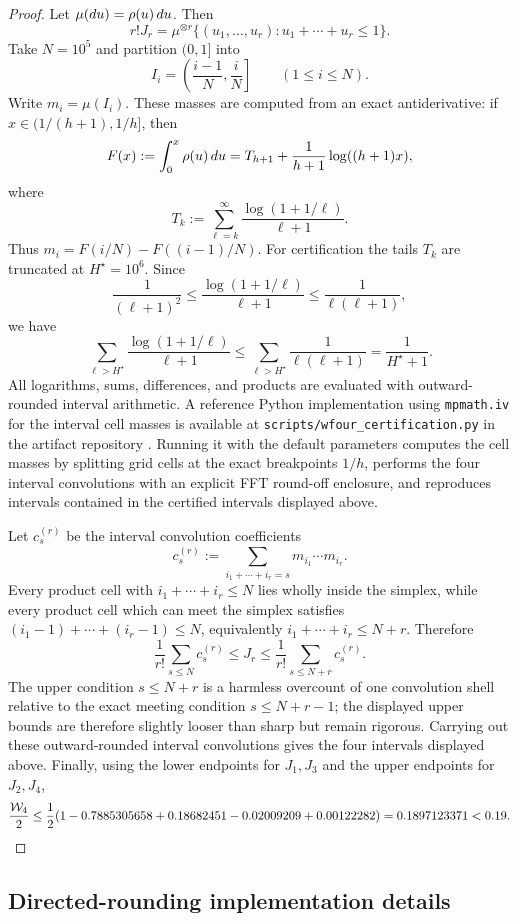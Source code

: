\begin{proof}
Let $\mu(du)=\rho(u)\,du$.  Then
\[
  r!J_r
  =
  \mu^{\otimes r}\{(u_1,\ldots,u_r):u_1+\cdots+u_r\le1\}.
\]
Take $N=10^5$ and partition $(0,1]$ into
\[
  I_i=\left(\frac{i-1}{N},\frac{i}{N}\right]\qquad(1\le i\le N).
\]
Write $m_i=\mu(I_i)$.  These masses are computed from an exact antiderivative:
if $x\in(1/(h+1),1/h]$, then
\[
  F(x):=\int_0^x\rho(u)\,du
  =
  T_{h+1}+\frac{1}{h+1}\log((h+1)x),
\]
where
\[
  T_k:=\sum_{\ell=k}^{\infty}\frac{\log(1+1/\ell)}{\ell+1}.
\]
Thus $m_i=F(i/N)-F((i-1)/N)$.  For certification the tails $T_k$ are truncated
at $H^\star=10^6$.  Since
\[
  \frac{1}{(\ell+1)^2}
  \le
  \frac{\log(1+1/\ell)}{\ell+1}
  \le
  \frac{1}{\ell(\ell+1)},
\]
we have
\[
  \sum_{\ell>H^\star}\frac{\log(1+1/\ell)}{\ell+1}
  \le
  \sum_{\ell>H^\star}\frac{1}{\ell(\ell+1)}
  =
  \frac{1}{H^\star+1}.
\]
All logarithms, sums, differences, and products are evaluated with
outward-rounded interval arithmetic.  A reference Python implementation using
\texttt{mpmath.iv} for the interval cell masses is available at
\texttt{scripts/wfour\_certification.py} in the artifact repository
\cite{ErdosHarness26}.  Running it with the default parameters computes the cell
masses by splitting grid cells at the exact breakpoints $1/h$, performs the
four interval convolutions with an explicit FFT round-off enclosure, and
reproduces intervals contained in the certified intervals displayed above.

Let $c_s^{(r)}$ be the interval convolution coefficients
\[
  c_s^{(r)}
  :=
  \sum_{i_1+\cdots+i_r=s}m_{i_1}\cdots m_{i_r}.
\]
Every product cell with $i_1+\cdots+i_r\le N$ lies wholly inside the simplex,
while every product cell which can meet the simplex satisfies
$(i_1-1)+\cdots+(i_r-1)\le N$, equivalently
$i_1+\cdots+i_r\le N+r$.  Therefore
\[
  \frac1{r!}\sum_{s\le N}c_s^{(r)}
  \le
  J_r
  \le
  \frac1{r!}\sum_{s\le N+r}c_s^{(r)}.
\]
The upper condition $s\le N+r$ is a harmless overcount of one convolution
shell relative to the exact meeting condition $s\le N+r-1$; the displayed
upper bounds are therefore slightly looser than sharp but remain rigorous.
Carrying out these outward-rounded interval convolutions gives the four
intervals displayed above.  Finally, using the lower endpoints for $J_1,J_3$
and the upper endpoints for $J_2,J_4$,
\[
  \frac{\mathcal{W}_4}{2}
  \le
  \frac12(1-0.7885305658+0.18682451-0.02009209+0.00122282)
  =
  0.1897123371<0.19.
\]
\end{proof}

\subsection{Directed-rounding implementation details}

